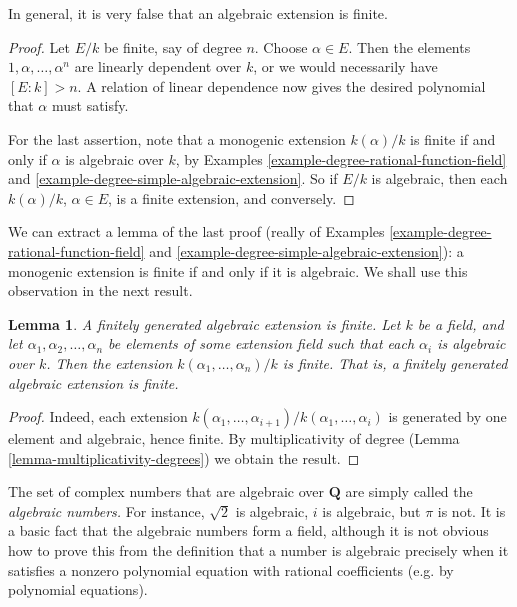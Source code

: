 \documentclass{stacks-project}
\newenvironment{slogan}{\comment}{\endcomment}
\theoremstyle{plain}
\newtheorem{lemma}[subsection]{Lemma}
\theoremstyle{definition}
\theoremstyle{remark}
\numberwithin{equation}{subsection}
\begin{document}
\noindent
In general, it is very false that an algebraic extension is finite.

\begin{proof}
Let $E/k$ be finite, say of degree $n$. Choose $\alpha \in E$. Then the
elements $1, \alpha, \ldots, \alpha^n$ are linearly
dependent over $k$, or we would necessarily have $[E : k] > n$. A relation of
linear dependence now gives the desired polynomial that $\alpha$ must satisfy.

\medskip\noindent
For the last assertion, note that a monogenic extension $k(\alpha)/k$ is
finite if and only if $\alpha$ is algebraic over $k$, by
Examples \ref{example-degree-rational-function-field} and
\ref{example-degree-simple-algebraic-extension}.
So if $E/k$ is algebraic, then each $k(\alpha)/k$, $\alpha \in E$, is a finite
extension, and conversely.
\end{proof}

\noindent
We can extract a lemma of the last proof (really of
Examples \ref{example-degree-rational-function-field} and
\ref{example-degree-simple-algebraic-extension}):
a monogenic extension is finite if and only if it is algebraic.
We shall use this observation in the next result.

\begin{lemma}
\label{lemma-algebraic-finitely-generated}
\begin{slogan}
A finitely generated algebraic extension is finite.
\end{slogan}
Let $k$ be a field, and let $\alpha_1, \alpha_2, \ldots, \alpha_n$ be elements
of some extension field such that each $\alpha_i$ is algebraic over $k$. Then
the extension $k(\alpha_1, \ldots, \alpha_n)/k$ is finite.
That is, a finitely generated algebraic extension is finite.
\end{lemma}

\begin{proof}
Indeed, each extension
$k(\alpha_{1}, \ldots, \alpha_{i+1})/k(\alpha_1, \ldots, \alpha_{i})$
is generated by one element and algebraic, hence finite.
By multiplicativity of degree (Lemma \ref{lemma-multiplicativity-degrees})
we obtain the result.
\end{proof}

\noindent
The set of complex numbers that are algebraic over $\mathbf{Q}$ are simply
called the {\it algebraic numbers.} For instance, $\sqrt{2}$ is algebraic,
$i$ is algebraic, but $\pi$ is not.
It is a basic fact that the algebraic numbers form a field, although it is not
obvious how to prove this from the definition that a number is algebraic
precisely when it satisfies a nonzero polynomial equation with rational
coefficients (e.g. by polynomial equations).
\end{document}
